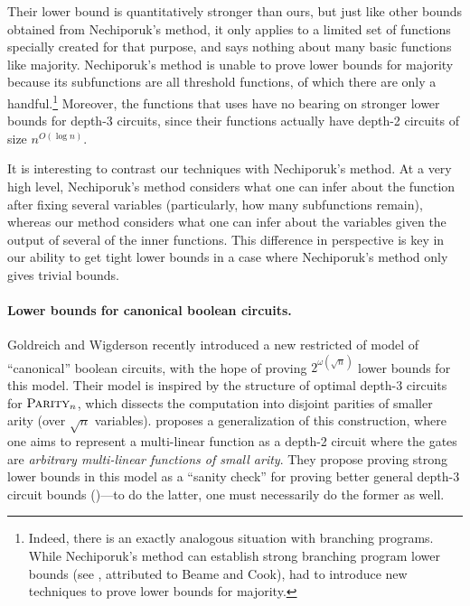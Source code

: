 \documentclass[10pt,a4paper]{article}
\theoremstyle{definition}
\theoremstyle{remark}
\newcommand{\mathsc}[1]{{\normalfont\textsc{#1}}}
\newcommand{\Parity}{\mathsc{Parity}}
\begin{document}
Their lower bound is quantitatively stronger than
ours,
but just like other bounds obtained from
Nechiporuk's method,
it only applies
to a limited set of functions specially created for that purpose,
and says nothing about many basic functions like majority.
Nechiporuk's method is unable to prove lower bounds for majority because its subfunctions are all threshold functions, of which there are only a handful.\footnote{Indeed, there is an exactly analogous situation with branching programs. While Nechiporuk's method can establish strong branching program lower bounds (see \cite[Theorem~2]{Raz91}, attributed to Beame and Cook), \cite{AM86,BPRS90} had to introduce new techniques to prove lower bounds for majority.} Moreover, the functions that \cite{HR15} uses have no bearing on stronger lower bounds for depth-3 circuits, since their functions actually have depth-2 circuits of size $n^{O(\log n)}$.




It is interesting to contrast our techniques with Nechiporuk's method. At a very high level, Nechiporuk's method considers what one can infer about the function after fixing several variables (particularly, how many subfunctions remain), whereas our method considers what one can infer about the variables given the output of several of the inner functions. This difference in perspective is key in our ability to get tight lower bounds in a case where Nechiporuk's method only gives trivial bounds.












\paragraph*{Lower bounds for canonical boolean circuits.} Goldreich and Wigderson \cite{GW20} recently introduced a new restricted of model of ``canonical'' boolean circuits, with the hope of proving $2^{\omega(\sqrt{n})}$ lower bounds for this model. Their model is inspired by the structure of optimal depth-3 circuits for $\Parity_n$, which dissects the computation into disjoint parities of smaller arity (over $\sqrt{n}$ variables). \cite{GW20} proposes a generalization of this construction, where one aims to represent a multi-linear function as a depth-2 circuit where the gates are \emph{arbitrary multi-linear functions of small arity}. They propose proving strong lower bounds in this model as a ``sanity check'' for proving better general depth-3 circuit bounds ()---to do the latter, one must necessarily do the former as well.
\end{document}
